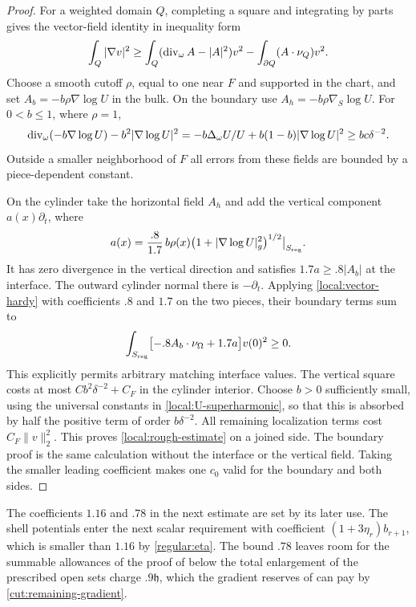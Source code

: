 \begin{proof}
For a weighted domain $Q$, completing a square and integrating by
parts gives the vector-field identity in inequality form
\begin{equation}\label{local:vector-hardy}
 \int_Q|\nabla v|^2\ge
 \int_Q(\operatorname{div}_\omega A-|A|^2)v^2
       -\int_{\partial Q}(A\cdot\nu_Q)v^2.
\end{equation}
Choose a smooth cutoff $\rho$, equal to one near $F$ and supported
in the chart, and set $A_b=-b\rho\nabla\log U$ in the bulk.  On the
boundary use $A_h=-b\rho\nabla_S\log U$.  For $0<b\le1$, where $\rho=1$,
\[
 \operatorname{div}_\omega(-b\nabla\log U)-b^2|\nabla\log U|^2
 =-b\Delta_\omega U/U+b(1-b)|\nabla\log U|^2
 \ge bc\delta^{-2}.
\]
Outside a smaller neighborhood of $F$ all errors from these fields
are bounded by a piece-dependent constant.

On the cylinder take the horizontal field $A_h$ and add the vertical
component $a(x)\partial_t$, where
\[
 a(x)=\frac{.8}{1.7}\,b\rho(x)
               \bigl(1+|\nabla\log U|_g^2\bigr)^{1/2}
                 \big|_{S_{\rm reg}}.
\]
It has zero divergence in the vertical direction and satisfies
$1.7a\ge .8|A_b|$ at the interface.  The outward cylinder normal there is
$-\partial_t$.  Applying \eqref{local:vector-hardy} with coefficients
$.8$ and $1.7$ on the two pieces, their boundary terms sum to
\[
 \int_{S_{\rm reg}}
       \bigl[-.8 A_b\cdot\nu_\Omega+1.7a\bigr]v(0)^2\ge0.
\]
This explicitly permits arbitrary matching interface values.  The
vertical square costs at most $C b^2\delta^{-2}+C_F$ in the
cylinder interior.  Choose $b>0$ sufficiently small, using the
universal constants in \eqref{local:U-superharmonic}, so that this
is absorbed by half the positive term of order $b\delta^{-2}$.
All remaining localization terms cost $C_F\|v\|_2^2$.
This proves \eqref{local:rough-estimate} on a joined side.  The
boundary proof is the same calculation without the interface or the vertical
field.  Taking the smaller leading coefficient makes one $c_0$
valid for the boundary and both sides.
\end{proof}

The coefficients $1.16$ and $.78$ in the next estimate are set by its later
use.  The shell potentials enter the next scalar requirement with
coefficient $(1+3\eta_r)b_{r+1}$, which is smaller than $1.16$ by
\eqref{regular:eta}.  The bound $.78$ leaves room for the summable
allowances of the proof of  below the total enlargement of the prescribed open sets
charge $.9\mathfrak h$, which the gradient reserves of
 can pay by \eqref{cut:remaining-gradient}.

